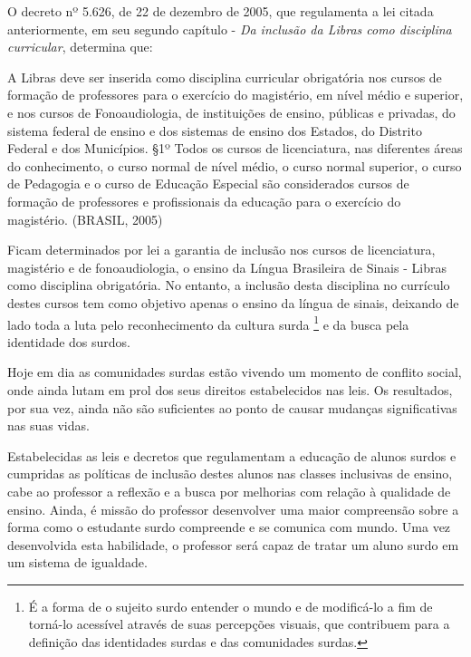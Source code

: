 \documentclass[brasil]{abnt}
\begin{document}
	O decreto nº 5.626, de 22 de dezembro de 2005, que regulamenta a lei citada anteriormente, em seu segundo capítulo - \textit{Da inclusão da Libras como disciplina curricular}, determina que:
		
			\begin{citacao} A Libras deve ser inserida como disciplina curricular obrigatória nos cursos de formação de professores para o exercício do magistério, em nível médio e superior, e nos cursos de 
							Fonoaudiologia, de instituições de ensino, públicas e privadas, do sistema federal de ensino e dos sistemas de ensino dos Estados, do Distrito Federal e dos Municípios.
							\S 1º Todos os cursos de licenciatura, nas diferentes áreas do conhecimento, o curso normal de nível médio, o curso normal superior, o curso de Pedagogia e o curso de Educação 
							Especial são considerados cursos de formação de professores e 
							profissionais da educação para o exercício do magistério. 
							(BRASIL, 2005)
			\end{citacao}
	
	Ficam determinados por lei a garantia de inclusão nos cursos de licenciatura, magistério e de fonoaudiologia, o ensino da Língua Brasileira de Sinais - Libras como disciplina obrigatória. No entanto, 
	a inclusão desta disciplina no currículo destes cursos tem como objetivo apenas o ensino da língua de sinais, deixando de lado toda a luta pelo reconhecimento da cultura surda \footnote{É a forma de o sujeito 
	surdo entender o mundo e de modificá-lo a fim de torná-lo acessível através de suas percepções visuais, que contribuem para a definição das identidades surdas e das comunidades surdas.} e da busca 
	pela identidade dos surdos.  
	
	Hoje em dia as comunidades surdas estão vivendo um momento de conflito social, onde ainda lutam em prol dos seus direitos estabelecidos nas leis. Os resultados, por sua vez, ainda não são suficientes ao 
	ponto de causar mudanças significativas nas suas vidas. 
		
	Estabelecidas as leis e decretos que regulamentam a educação de alunos surdos e cumpridas as políticas de inclusão destes alunos nas classes inclusivas de ensino, cabe ao professor a reflexão e a busca por 
	melhorias com relação à qualidade de ensino. Ainda, é missão do professor desenvolver uma maior compreensão sobre a forma como o estudante surdo compreende e se comunica com mundo. 
	Uma vez desenvolvida esta habilidade, o professor será capaz de tratar um aluno surdo em um sistema de igualdade. 		     
	
\end{document}
